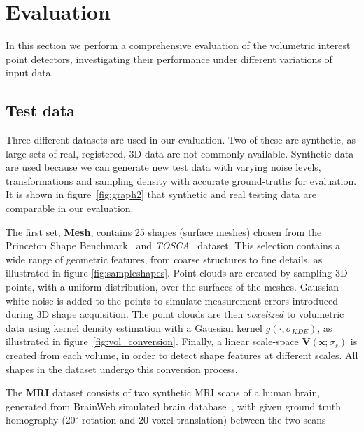 \section{Evaluation}
\label{sec:experiments}
In this section we perform a comprehensive evaluation of the volumetric interest point detectors, investigating their performance under different variations of input data. 

\subsection{Test data}
\label{sec:testdata}
Three different datasets are used in our evaluation. Two of these are synthetic, as large sets of real, registered, 3D data are not commonly available. Synthetic data are used because we can generate new test data with varying noise levels, transformations and sampling density with accurate ground-truths for evaluation. It is shown in figure~\ref{fig:graph2} that synthetic and real testing data are comparable in our evaluation. 

The first set, \textbf{Mesh}, contains 25 shapes (surface meshes) chosen from the Princeton Shape Benchmark~\cite{Shilane2004} and \emph{TOSCA}~\cite{Bronstein2008} dataset. This selection contains a wide range of geometric features, from coarse structures to fine details, as illustrated in figure \ref{fig:sampleshapes}. Point clouds are created by sampling 3D points, with a uniform distribution, over the surfaces of the meshes. Gaussian white noise is added to the points to simulate measurement errors introduced during 3D shape acquisition. 
The point clouds are then \emph{voxelized} to volumetric data using kernel density estimation with a Gaussian kernel $g(\cdot,\sigma_{KDE})$, as illustrated in figure~\ref{fig:vol_conversion}.
Finally, a linear scale-space $\mathbf{V}(\mathbf{x};\sigma_s)$ is created from each volume, in order to detect shape features at different scales. All shapes in the dataset undergo this conversion process. 

The \textbf{MRI} dataset consists of two synthetic MRI scans of a human brain, generated from BrainWeb simulated brain database~\cite{Cocosco1997}, with given ground truth homography ($20^{\circ}$ rotation and $20$ voxel translation) between the two scans

